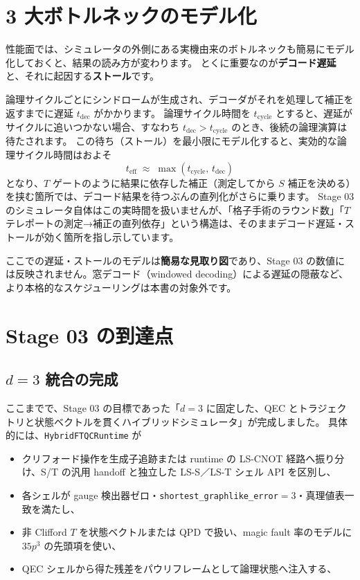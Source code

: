 \section{3 大ボトルネックのモデル化}\label{sec:bottlenecks}

性能面では、シミュレータの外側にある実機由来のボトルネックも簡易にモデル化しておくと、結果の読み方が変わります。
とくに重要なのが\textbf{デコード遅延}と、それに起因する\textbf{ストール}です。

論理サイクルごとにシンドロームが生成され、デコーダがそれを処理して補正を返すまでに遅延 $t_{\mathrm{dec}}$ がかかります。
論理サイクル時間を $t_{\mathrm{cycle}}$ とすると、遅延がサイクルに追いつかない場合、すなわち $t_{\mathrm{dec}} > t_{\mathrm{cycle}}$ のとき、後続の論理演算は待たされます。
この待ち（ストール）を最小限にモデル化すると、実効的な論理サイクル時間はおよそ
\[
  t_{\mathrm{eff}} \;\approx\; \max(t_{\mathrm{cycle}},\, t_{\mathrm{dec}})
\]
となり、$T$ ゲートのように結果に依存した補正（測定してから $S$ 補正を決める）を挟む箇所では、デコード結果を待つぶんの直列化がさらに乗ります。
Stage 03 のシミュレータ自体はこの実時間を扱いませんが、「格子手術のラウンド数」「$T$ テレポートの測定→補正の直列依存」という構造は、そのままデコード遅延・ストールが効く箇所を指し示しています。

\begin{notebox}
  ここでの遅延・ストールのモデルは\textbf{簡易な見取り図}であり、Stage 03 の数値には反映されません。窓デコード（windowed decoding）による遅延の隠蔽など、より本格的なスケジューリングは本書の対象外です。
\end{notebox}

\section{Stage 03 の到達点}\label{sec:stage_c_marker}

\subsection{$d=3$ 統合の完成}

ここまでで、Stage 03 の目標であった「$d=3$ に固定した、QEC とトラジェクトリと状態ベクトルを貫くハイブリッドシミュレータ」が完成しました。
具体的には、\texttt{HybridFTQCRuntime} が

\begin{itemize}
  \item クリフォード操作を生成子追跡または runtime の LS-CNOT 経路へ振り分け、S/T の汎用 handoff と独立した LS-S／LS-T シェル API を区別し、
  \item 各シェルが gauge 検出器ゼロ・\texttt{shortest\_graphlike\_error}$=3$・真理値表一致を満たし、
  \item 非 Clifford $T$ を状態ベクトルまたは QPD で扱い、magic fault 率のモデルに $35p^3$ の先頭項を使い、
  \item QEC シェルから得た残差をパウリフレームとして論理状態へ注入する、
\end{itemize}

